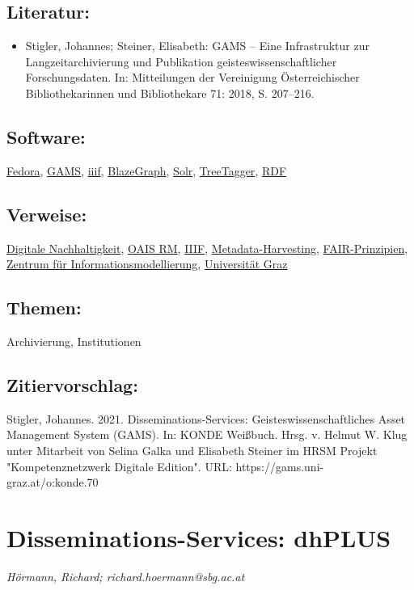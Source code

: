 \documentclass{article}
\begin{document}
        \subsection*{Literatur:}\begin{itemize}\item Stigler, Johannes; Steiner, Elisabeth: GAMS – Eine Infrastruktur zur Langzeitarchivierung und
                              Publikation geisteswissenschaftlicher Forschungsdaten. In: Mitteilungen der Vereinigung Österreichischer
                              Bibliothekarinnen und Bibliothekare 71: 2018, S. 207–216.\end{itemize}\subsection*{Software:}\href{https://duraspace.org/fedora/}{Fedora}, \href{http://gams.uni-graz.at/archive/objects/o:gams.doku/methods/sdef:TEI/get?locale=de}{GAMS}, \href{https://iiif.io/}{iiif}, \href{https://www.blazegraph.com/}{BlazeGraph}, \href{http://lucene.apache.org/solr/}{Solr}, \href{https://www.cis.uni-muenchen.de/~schmid/tools/TreeTagger/}{TreeTagger}, \href{https://www.w3.org/RDF/}{RDF}\subsection*{Verweise:}\href{https://gams.uni-graz.at/o:konde.6}{Digitale Nachhaltigkeit}, \href{https://gams.uni-graz.at/o:konde.11}{OAIS RM}, \href{https://gams.uni-graz.at/o:konde.123}{IIIF}, \href{https://gams.uni-graz.at/o:konde.10}{Metadata-Harvesting}, \href{https://gams.uni-graz.at/o:konde.7}{FAIR-Prinzipien}, \href{https://gams.uni-graz.at/o:konde.217}{Zentrum für Informationsmodellierung}, \href{https://gams.uni-graz.at/o:konde.227}{Universität Graz}\subsection*{Themen:}Archivierung, Institutionen\subsection*{Zitiervorschlag:}Stigler, Johannes. 2021. Disseminations-Services: Geisteswissenschaftliches Asset Management
               System (GAMS). In: KONDE Weißbuch. Hrsg. v. Helmut W. Klug unter Mitarbeit von Selina Galka und Elisabeth Steiner im HRSM Projekt "Kompetenznetzwerk Digitale Edition". URL: https://gams.uni-graz.at/o:konde.70\newpage\section*{Disseminations-Services: dhPLUS} \emph{Hörmann, Richard; richard.hoermann@sbg.ac.at}\\
        
\end{document}
